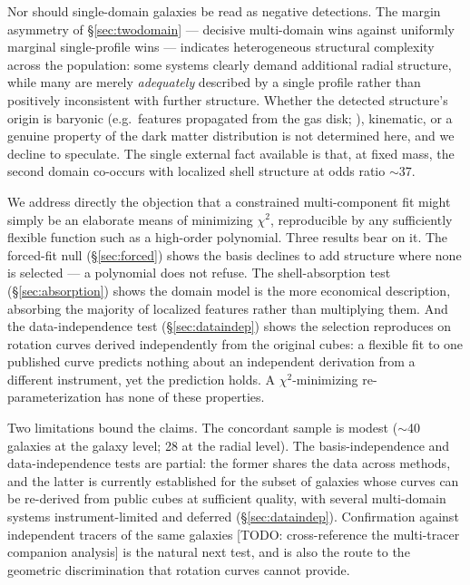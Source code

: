 \documentclass[twocolumn]{aastex631}
\begin{document}
Nor should single-domain galaxies be read as negative detections. The margin
asymmetry of \S\ref{sec:twodomain} --- decisive multi-domain wins against
uniformly marginal single-profile wins --- indicates heterogeneous structural
complexity across the population: some systems clearly demand additional
radial structure, while many are merely \emph{adequately} described by a
single profile rather than positively inconsistent with further structure.
Whether the detected structure's origin is baryonic (e.g.\ features
propagated from the gas disk; \citealt{Sancisi2004}), kinematic, or a genuine
property of the dark matter distribution is not determined here, and we
decline to speculate. The single external fact available is that, at fixed
mass, the second domain co-occurs with localized shell structure at odds
ratio $\sim$37.

We address directly the objection that a constrained multi-component fit might
simply be an elaborate means of minimizing $\chi^2$, reproducible by any
sufficiently flexible function such as a high-order polynomial. Three results
bear on it. The forced-fit null (\S\ref{sec:forced}) shows the basis declines to
add structure where none is selected --- a polynomial does not refuse. The
shell-absorption test (\S\ref{sec:absorption}) shows the domain model is the more
economical description, absorbing the majority of localized features rather than
multiplying them. And the data-independence test (\S\ref{sec:dataindep}) shows
the selection reproduces on rotation curves derived independently from the
original cubes: a flexible fit to one published curve predicts nothing about an
independent derivation from a different instrument, yet the prediction holds. A
$\chi^2$-minimizing re-parameterization has none of these properties.

Two limitations bound the claims. The concordant sample is modest
($\sim$40 galaxies at the galaxy level; 28 at the radial level). The
basis-independence and data-independence tests are partial: the former shares the
data across methods, and the latter is currently established for the subset of
galaxies whose curves can be re-derived from public cubes at sufficient quality,
with several multi-domain systems instrument-limited and deferred
(\S\ref{sec:dataindep}). Confirmation against independent tracers of the same
galaxies [TODO: cross-reference the multi-tracer companion analysis] is the
natural next test, and is also the route to the geometric discrimination that
rotation curves cannot provide.

\end{document}
